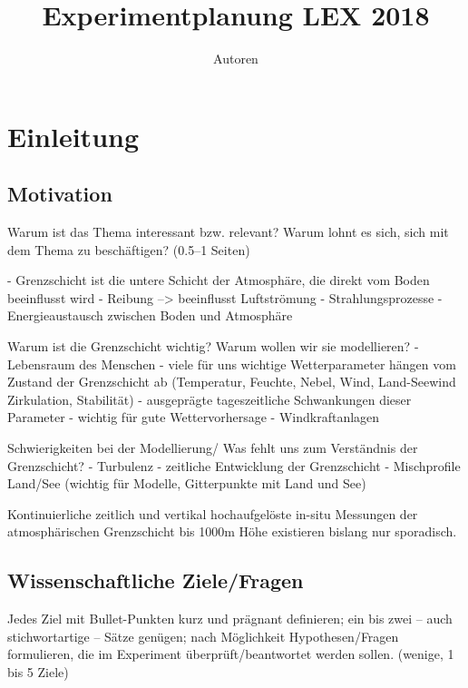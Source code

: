 \documentclass[a4paper,11pt,DIV=calc,tablecaptionabove,headinclude,twoside]{article}
\title{Experimentplanung LEX 2018}%
\author{Autoren}
\begin{document}
\maketitle



\section{Einleitung}
\subsection{Motivation}
Warum ist das Thema interessant bzw. relevant? Warum lohnt es sich, sich mit dem Thema zu beschäftigen? (0.5--1 Seiten)

- Grenzschicht ist die untere Schicht der Atmosphäre, die direkt vom Boden beeinflusst
wird
- Reibung --> beeinflusst Luftströmung
- Strahlungsprozesse
- Energieaustausch zwischen Boden und Atmosphäre

Warum ist die Grenzschicht wichtig? Warum wollen wir sie modellieren?
- Lebensraum des Menschen
- viele für uns wichtige Wetterparameter hängen vom Zustand der Grenzschicht ab
(Temperatur, Feuchte, Nebel, Wind, Land-Seewind Zirkulation, Stabilität)
- ausgeprägte tageszeitliche Schwankungen dieser Parameter
- wichtig für gute Wettervorhersage
- Windkraftanlagen

Schwierigkeiten bei der Modellierung/
Was fehlt uns zum Verständnis der Grenzschicht?
- Turbulenz
- zeitliche Entwicklung der Grenzschicht
- Mischprofile Land/See (wichtig für Modelle, Gitterpunkte mit Land und See)

Kontinuierliche zeitlich und vertikal hochaufgelöste in-situ Messungen der
atmosphärischen Grenzschicht bis 1000m Höhe existieren bislang nur sporadisch.

\subsection{Wissenschaftliche Ziele/Fragen}
Jedes Ziel mit Bullet-Punkten kurz und prägnant definieren; ein bis zwei -- auch stichwortartige -- Sätze genügen; nach Möglichkeit Hypothesen/Fragen formulieren, die im Experiment überprüft/beantwortet werden sollen. (wenige, 1 bis 5 Ziele)\\
\end{document}
